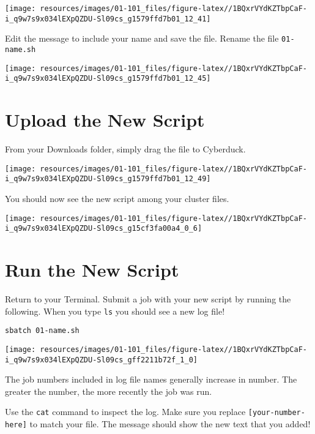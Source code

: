 \documentclass[
]{book}
\begin{document}
\texttt{[image: resources/images/01-101\_files/figure-latex//1BQxrVYdKZTbpCaF-i\_q9w7s9x034lEXpQZDU-Sl09cs\_g1579ffd7b01\_12\_41]}

Edit the message to include your name and save the file. Rename the file \texttt{01-name.sh}

\texttt{[image: resources/images/01-101\_files/figure-latex//1BQxrVYdKZTbpCaF-i\_q9w7s9x034lEXpQZDU-Sl09cs\_g1579ffd7b01\_12\_45]}

\hypertarget{upload-the-new-script}{%
\section{Upload the New Script}\label{upload-the-new-script}}

From your Downloads folder, simply drag the file to Cyberduck.

\texttt{[image: resources/images/01-101\_files/figure-latex//1BQxrVYdKZTbpCaF-i\_q9w7s9x034lEXpQZDU-Sl09cs\_g1579ffd7b01\_12\_49]}

You should now see the new script among your cluster files.

\texttt{[image: resources/images/01-101\_files/figure-latex//1BQxrVYdKZTbpCaF-i\_q9w7s9x034lEXpQZDU-Sl09cs\_g15cf3fa00a4\_0\_6]}

\hypertarget{run-the-new-script}{%
\section{Run the New Script}\label{run-the-new-script}}

Return to your Terminal. Submit a job with your new script by running the following. When you type \texttt{ls} you should see a new log file!

\begin{verbatim}
sbatch 01-name.sh
\end{verbatim}

\texttt{[image: resources/images/01-101\_files/figure-latex//1BQxrVYdKZTbpCaF-i\_q9w7s9x034lEXpQZDU-Sl09cs\_gff2211b72f\_1\_0]}

The job numbers included in log file names generally increase in number. The greater the number, the more recently the job was run.

Use the \texttt{cat} command to inspect the log. Make sure you replace \texttt{{[}your-number-here{]}} to match your file. The message should show the new text that you added!
\end{document}
